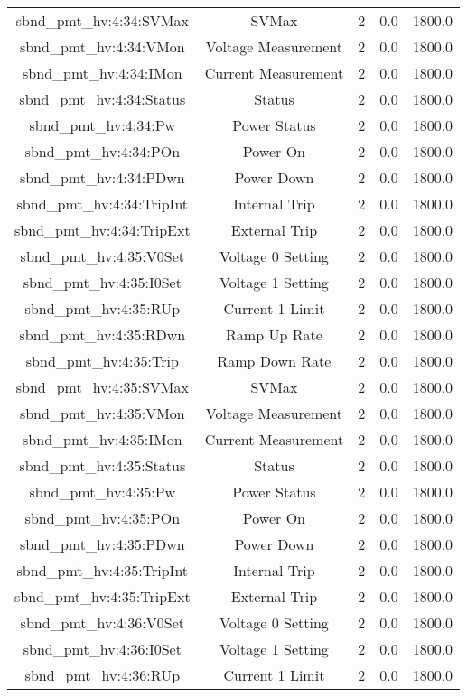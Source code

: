 \begin{table}[ptb]
\begin{tabular}{c | c c c c}
sbnd_pmt_hv:4:34:SVMax & SVMax & 2 & 0.0 & 1800.0\\ 
sbnd_pmt_hv:4:34:VMon & Voltage Measurement & 2 & 0.0 & 1800.0\\ 
sbnd_pmt_hv:4:34:IMon & Current Measurement & 2 & 0.0 & 1800.0\\ 
sbnd_pmt_hv:4:34:Status & Status & 2 & 0.0 & 1800.0\\ 
sbnd_pmt_hv:4:34:Pw & Power Status & 2 & 0.0 & 1800.0\\ 
sbnd_pmt_hv:4:34:POn & Power On & 2 & 0.0 & 1800.0\\ 
sbnd_pmt_hv:4:34:PDwn & Power Down & 2 & 0.0 & 1800.0\\ 
sbnd_pmt_hv:4:34:TripInt & Internal Trip & 2 & 0.0 & 1800.0\\ 
sbnd_pmt_hv:4:34:TripExt & External Trip & 2 & 0.0 & 1800.0\\ 
sbnd_pmt_hv:4:35:V0Set & Voltage 0 Setting & 2 & 0.0 & 1800.0\\ 
sbnd_pmt_hv:4:35:I0Set & Voltage 1 Setting & 2 & 0.0 & 1800.0\\ 
sbnd_pmt_hv:4:35:RUp & Current 1 Limit & 2 & 0.0 & 1800.0\\ 
sbnd_pmt_hv:4:35:RDwn & Ramp Up Rate & 2 & 0.0 & 1800.0\\ 
sbnd_pmt_hv:4:35:Trip & Ramp Down Rate & 2 & 0.0 & 1800.0\\ 
sbnd_pmt_hv:4:35:SVMax & SVMax & 2 & 0.0 & 1800.0\\ 
sbnd_pmt_hv:4:35:VMon & Voltage Measurement & 2 & 0.0 & 1800.0\\ 
sbnd_pmt_hv:4:35:IMon & Current Measurement & 2 & 0.0 & 1800.0\\ 
sbnd_pmt_hv:4:35:Status & Status & 2 & 0.0 & 1800.0\\ 
sbnd_pmt_hv:4:35:Pw & Power Status & 2 & 0.0 & 1800.0\\ 
sbnd_pmt_hv:4:35:POn & Power On & 2 & 0.0 & 1800.0\\ 
sbnd_pmt_hv:4:35:PDwn & Power Down & 2 & 0.0 & 1800.0\\ 
sbnd_pmt_hv:4:35:TripInt & Internal Trip & 2 & 0.0 & 1800.0\\ 
sbnd_pmt_hv:4:35:TripExt & External Trip & 2 & 0.0 & 1800.0\\ 
sbnd_pmt_hv:4:36:V0Set & Voltage 0 Setting & 2 & 0.0 & 1800.0\\ 
sbnd_pmt_hv:4:36:I0Set & Voltage 1 Setting & 2 & 0.0 & 1800.0\\ 
sbnd_pmt_hv:4:36:RUp & Current 1 Limit & 2 & 0.0 & 1800.0\\ 

\end{tabular}
\end{table}
